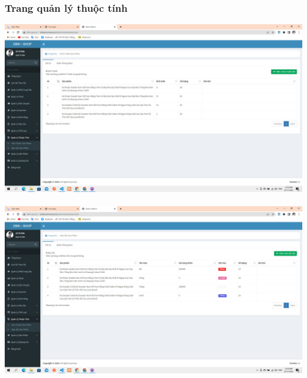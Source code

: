 \documentclass[12pt,a4paper,2sides]{report}
\begin{document}
\subsubsection{Trang quản lý thuộc tính}
    \includegraphics[width=1\linewidth]{lib/results/kichthuocsp.jpg}\\\vspace*{1cm}  
    \hspace{5cm}{Hình 49. Quản lý kích thước sản phẩm}\\
    \includegraphics[width=1\linewidth]{lib/results/mausacsp.jpg}\\\vspace*{1cm}  
    \hspace{5cm}{Hình 50. Quản lý màu sắc sản phẩm}\\
\end{document}

